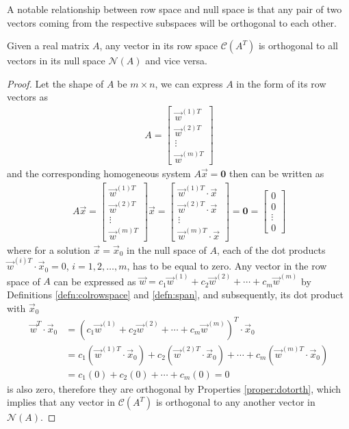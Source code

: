 A notable relationship between row space and null space is that any pair of two vectors coming from the respective subspaces will be orthogonal to each other. 
\begin{proper}
\label{proper:rownullortho}
Given a real matrix $A$, any vector in its row space $\mathcal{C}(A^T)$ is orthogonal to all vectors in its null space $\mathcal{N}(A)$ and vice versa.
\end{proper}
\begin{proof}
Let the shape of $A$ be $m \times n$, we can express $A$ in the form of its row vectors as
\begin{align*}
A = 
\left[\begin{array}{c}
\vec{w}^{(1)T} \\
\hline
\vec{w}^{(2)T}\\
\hline
\vdots \\
\hline
\vec{w}^{(m)T}
\end{array}\right]
\end{align*}
and the corresponding homogeneous system $A\vec{x} = \textbf{0}$ then can be written as
\begin{align*}
A\vec{x} =
\left[\begin{array}{c}
\vec{w}^{(1)T} \\
\hline
\vec{w}^{(2)T}\\
\hline
\vdots \\
\hline
\vec{w}^{(m)T}
\end{array}\right]
\vec{x}
=
\left[\begin{array}{c}
\vec{w}^{(1)T} \cdot \vec{x} \\
\vec{w}^{(2)T} \cdot \vec{x} \\
\vdots \\
\vec{w}^{(m)T} \cdot \vec{x}
\end{array}\right]
= \textbf{0}
=
\left[\begin{array}{c}
0 \\
0 \\
\vdots \\
0
\end{array}\right]
\end{align*}
where for a solution $\vec{x} = \vec{x}_0$ in the null space of $A$, each of the dot products $\vec{w}^{(i)T} \cdot \vec{x}_0 = 0$, $i = 1, 2, \ldots, m$, has to be equal to zero. Any vector in the row space of $A$ can be expressed as $\vec{w} = c_1\vec{w}^{(1)} + c_2\vec{w}^{(2)} + \cdots + c_m\vec{w}^{(m)}$ by Definitions \ref{defn:colrowspace} and \ref{defn:span}, and subsequently, its dot product with $\vec{x}_0$
\begin{align*}
\vec{w}^T \cdot \vec{x}_0 &= (c_1\vec{w}^{(1)} + c_2\vec{w}^{(2)} + \cdots + c_m\vec{w}^{(m)})^T \cdot \vec{x}_0 \\
&= c_1(\vec{w}^{(1)T} \cdot \vec{x}_0) + c_2(\vec{w}^{(2)T} \cdot \vec{x}_0) + \cdots + c_m(\vec{w}^{(m)T} \cdot \vec{x}_0) \\
&= c_1(0) + c_2(0) + \cdots + c_m(0) = 0
\end{align*}
is also zero, therefore they are orthogonal by Properties \ref{proper:dotorth}, which implies that any vector in $\mathcal{C}(A^T)$ is orthogonal to any another vector in $\mathcal{N}(A)$.
\end{proof}
